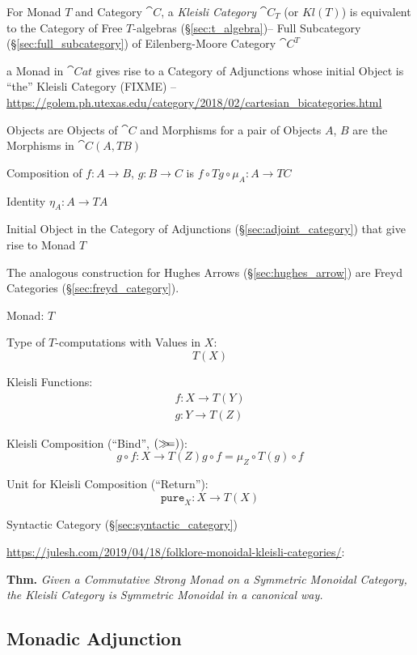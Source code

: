 For Monad $T$ and Category $\cat{C}$, a \emph{Kleisli Category}
$\cat{C}_T$ (or $Kl(T)$) is equivalent to the Category of Free
$T$-algebras (\S\ref{sec:t_algebra})-- Full Subcategory
(\S\ref{sec:full_subcategory}) of Eilenberg-Moore Category
$\cat{C}^T$

a Monad in $\cat{Cat}$ gives rise to a Category of Adjunctions whose initial
Object is ``the'' Kleisli Category (FIXME)
--\url{https://golem.ph.utexas.edu/category/2018/02/cartesian_bicategories.html}

Objects are Objects of $\cat{C}$ and Morphisms for a pair of
Objects $A$, $B$ are the Morphisms in $\cat{C}(A, T B)$

Composition of $f : A \rightarrow B$, $g : B \rightarrow C$ is $f
\circ T g \circ \mu_A : A \rightarrow TC$

Identity $\eta_A : A \rightarrow T A$

Initial Object in the Category of Adjunctions
(\S\ref{sec:adjoint_category}) that give rise to Monad $T$

The analogous construction for Hughes Arrows
(\S\ref{sec:hughes_arrow}) are Freyd Categories
(\S\ref{sec:freyd_category}).

Monad: $T$

Type of $T$-computations with Values in $X$:
\[
  T (X)
\]

Kleisli Functions:
\[
\begin{split}
  f : X \rightarrow T(Y) \\
  g : Y \rightarrow T(Z)
\end{split}
\]

Kleisli Composition (``Bind'', $\mathtt{(\mathsf{\gg\kern-3pt=})}$):
\[
  g \circ f : X \rightarrow T(Z)
  g \circ f = \mu_Z \circ T(g) \circ f
\]

Unit for Kleisli Composition (``Return''):
\[
  \mathtt{pure}_X : X \rightarrow T (X)
\]

Syntactic Category (\S\ref{sec:syntactic_category})

\url{https://julesh.com/2019/04/18/folklore-monoidal-kleisli-categories/}:

\textbf{Thm.} \emph{Given a Commutative Strong Monad on a Symmetric Monoidal
  Category, the Kleisli Category is Symmetric Monoidal in a canonical way.}



\subsection{Monadic Adjunction}\label{sec:monadic_adjunction}

